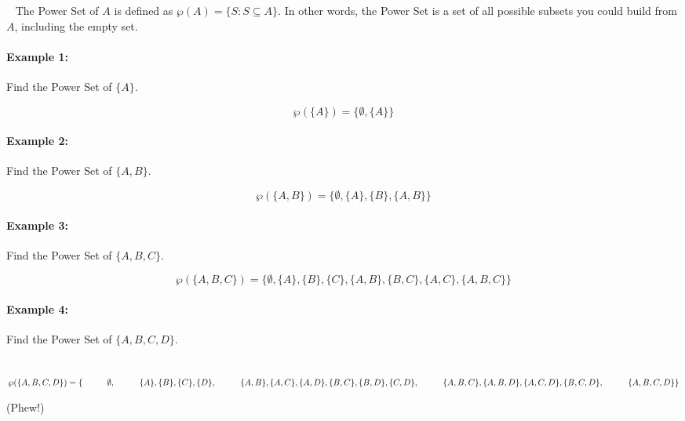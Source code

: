 \documentclass[a4paper,12pt]{book}
\begin{document}
        \begin{intro}{\ }
            The Power Set of $A$ is defined as
            $\wp(A) = \{ S : S \subseteq A \}$. In other words, the Power Set
            is a set of all possible subsets you could build from $A$, including
            the empty set.

            \paragraph{Example 1:} Find the Power Set of $\{A\}$.

            $$\wp(\{A\}) = \{ \emptyset, \{A\} \}$$

            \paragraph{Example 2:} Find the Power Set of $\{A, B\}$.

            $$\wp(\{A, B\}) = \{ \emptyset, \{A\}, \{B\}, \{A, B\} \}$$

            \paragraph{Example 3:} Find the Power Set of $\{A, B, C\}$.

            $$\wp(\{A, B, C\}) =
                \{ \emptyset,
                    \{A\}, \{B\}, \{C\},
                    \{A, B\}, \{B, C\}, \{A, C\},
                    \{A, B, C\}
                \}$$
                
            \paragraph{Example 4:} Find the Power Set of $\{A, B, C, D\}$.

            ~\\
            $\wp(\{A, B, C, D\}) = \{ \\
                    \hspace*{1cm} \emptyset, \\
                    \hspace*{1cm} \{ A \}, \{ B \}, \{ C \}, \{ D \}, \\
                    \hspace*{1cm} \{ A, B \}, \{ A, C \}, \{ A, D \},
                     \{ B, C \}, \{ B, D \},
                     \{ C, D \}, \\
                    \hspace*{1cm} \{ A, B, C \}, \{ A, B, D \}, \{ A, C, D \}, \{ B, C, D \}, \\
                    \hspace*{1cm} \{ A, B, C, D \} \\
                \}$

            (Phew!)
        \end{intro}
\end{document}
